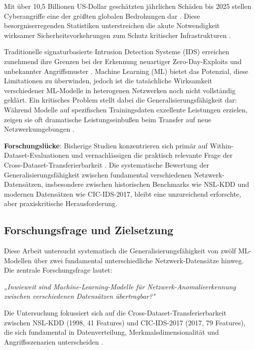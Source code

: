 \documentclass[11pt,a4paper]{article}
\begin{document}
    Mit über 10,5 Billionen US-Dollar geschätzten jährlichen Schäden bis 2025 stellen Cyberangriffe eine der größten globalen Bedrohungen dar \parencite{GlobalRisksReport2024}. Diese besorgniserregenden Statistiken unterstreichen die akute Notwendigkeit wirksamer Sicherheitsvorkehrungen zum Schutz kritischer Infrastrukturen \parencite{Taman2024}.

    Traditionelle signaturbasierte Intrusion Detection Systeme (IDS) erreichen zunehmend ihre Grenzen bei der Erkennung neuartiger Zero-Day-Exploits und unbekannter Angriffsmuster \parencite{Ring2019,Belavagi2016}. Machine Learning (ML) bietet das Potenzial, diese Limitationen zu überwinden, jedoch ist die tatsächliche Wirksamkeit verschiedener ML-Modelle in heterogenen Netzwerken noch nicht vollständig geklärt. Ein kritisches Problem stellt dabei die Generalisierungsfähigkeit dar: Während Modelle auf spezifischen Trainingsdaten exzellente Leistungen erzielen, zeigen sie oft dramatische Leistungseinbußen beim Transfer auf neue Netzwerkumgebungen \parencite{Ring2019}.

    \textbf{Forschungslücke}: Bisherige Studien konzentrieren sich primär auf Within-Dataset-Evaluationen und vernachlässigen die praktisch relevante Frage der Cross-Dataset-Transferierbarkeit \parencite{Mourouzis2021}. Die systematische Bewertung der Generalisierungsfähigkeit zwischen fundamental verschiedenen Netzwerk-Datensätzen, insbesondere zwischen historischen Benchmarks wie NSL-KDD und modernen Datensätzen wie CIC-IDS-2017, bleibt eine unzureichend erforschte, aber praxiskritische Herausforderung.

    \subsection{Forschungsfrage und Zielsetzung}

    Diese Arbeit untersucht systematisch die Generalisierungsfähigkeit von zwölf ML-Modellen über zwei fundamental unterschiedliche Netzwerk-Datensätze hinweg. Die zentrale Forschungsfrage lautet:

    \textit{„Inwieweit sind Machine-Learning-Modelle für Netzwerk-Anomalieerkennung zwischen verschiedenen Datensätzen übertragbar?"}

    Die Untersuchung fokussiert sich auf die Cross-Dataset-Transferierbarkeit zwischen NSL-KDD (1998, 41 Features) und CIC-IDS-2017 (2017, 79 Features), die sich fundamental in Datenverteilung, Merkmalsdimensionalität und Angriffsszenarien unterscheiden \parencite{Mourouzis2021}.
\end{document}
